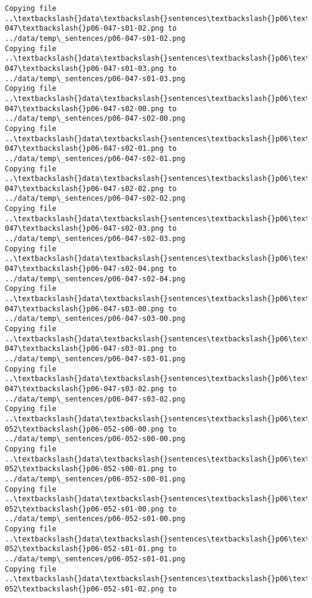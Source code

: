 \documentclass[11pt]{article}
\begin{document}
\begin{Verbatim}[commandchars=\\\{\}]
Copying file ..\textbackslash{}data\textbackslash{}sentences\textbackslash{}p06\textbackslash{}p06-047\textbackslash{}p06-047-s01-02.png to
../data/temp\_sentences/p06-047-s01-02.png
Copying file ..\textbackslash{}data\textbackslash{}sentences\textbackslash{}p06\textbackslash{}p06-047\textbackslash{}p06-047-s01-03.png to
../data/temp\_sentences/p06-047-s01-03.png
Copying file ..\textbackslash{}data\textbackslash{}sentences\textbackslash{}p06\textbackslash{}p06-047\textbackslash{}p06-047-s02-00.png to
../data/temp\_sentences/p06-047-s02-00.png
Copying file ..\textbackslash{}data\textbackslash{}sentences\textbackslash{}p06\textbackslash{}p06-047\textbackslash{}p06-047-s02-01.png to
../data/temp\_sentences/p06-047-s02-01.png
Copying file ..\textbackslash{}data\textbackslash{}sentences\textbackslash{}p06\textbackslash{}p06-047\textbackslash{}p06-047-s02-02.png to
../data/temp\_sentences/p06-047-s02-02.png
Copying file ..\textbackslash{}data\textbackslash{}sentences\textbackslash{}p06\textbackslash{}p06-047\textbackslash{}p06-047-s02-03.png to
../data/temp\_sentences/p06-047-s02-03.png
Copying file ..\textbackslash{}data\textbackslash{}sentences\textbackslash{}p06\textbackslash{}p06-047\textbackslash{}p06-047-s02-04.png to
../data/temp\_sentences/p06-047-s02-04.png
Copying file ..\textbackslash{}data\textbackslash{}sentences\textbackslash{}p06\textbackslash{}p06-047\textbackslash{}p06-047-s03-00.png to
../data/temp\_sentences/p06-047-s03-00.png
Copying file ..\textbackslash{}data\textbackslash{}sentences\textbackslash{}p06\textbackslash{}p06-047\textbackslash{}p06-047-s03-01.png to
../data/temp\_sentences/p06-047-s03-01.png
Copying file ..\textbackslash{}data\textbackslash{}sentences\textbackslash{}p06\textbackslash{}p06-047\textbackslash{}p06-047-s03-02.png to
../data/temp\_sentences/p06-047-s03-02.png
Copying file ..\textbackslash{}data\textbackslash{}sentences\textbackslash{}p06\textbackslash{}p06-052\textbackslash{}p06-052-s00-00.png to
../data/temp\_sentences/p06-052-s00-00.png
Copying file ..\textbackslash{}data\textbackslash{}sentences\textbackslash{}p06\textbackslash{}p06-052\textbackslash{}p06-052-s00-01.png to
../data/temp\_sentences/p06-052-s00-01.png
Copying file ..\textbackslash{}data\textbackslash{}sentences\textbackslash{}p06\textbackslash{}p06-052\textbackslash{}p06-052-s01-00.png to
../data/temp\_sentences/p06-052-s01-00.png
Copying file ..\textbackslash{}data\textbackslash{}sentences\textbackslash{}p06\textbackslash{}p06-052\textbackslash{}p06-052-s01-01.png to
../data/temp\_sentences/p06-052-s01-01.png
Copying file ..\textbackslash{}data\textbackslash{}sentences\textbackslash{}p06\textbackslash{}p06-052\textbackslash{}p06-052-s01-02.png to

\end{Verbatim}
\end{document}
